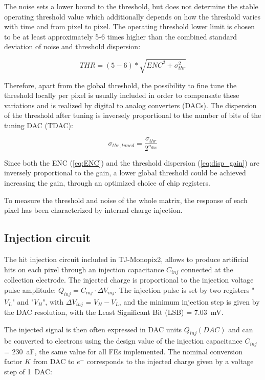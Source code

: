 \medskip
The noise sets a lower bound to the threshold, but does not determine the stable operating threshold value which additionally depends on how the threshold varies with time and from pixel to pixel. The operating threshold lower limit is chosen to be at least approximately 5-6 times higher than the combined standard deviation of noise and threshold dispersion:

\begin{equation}
THR=(5-6) *\sqrt{ENC^{2} + \sigma_{thr}^{2}}
\end{equation}

\medskip
Therefore, apart from the global threshold, the possibility to fine tune the threshold locally per pixel is usually included in order to compensate these variations and is realized by digital to analog converters (DACs). The dispersion of the threshold after tuning is inversely proportional to the number of bits of the tuning DAC (TDAC):

\begin{equation}
\sigma_{thr,tuned} = \frac{\sigma_{thr}}{2^{n_{dac}}}
\end{equation}


\medskip
Since both the ENC (\autoref{eq:ENC}) and the threshold dispersion (\autoref{eq:disp_gain}) are inversely proportional to the gain, a lower global threshold could be achieved increasing the gain, through an optimized choice of chip registers.

To measure the threshold and noise of the whole matrix, the response of each pixel has been characterized by internal charge injection. \\


\subsection{Injection circuit} 
\label{sec:inj_circuit_subsection}

The hit injection circuit included in TJ-Monopix2, allows to produce artificial hits on each pixel through an injection capacitance \textbf{$C_{inj}$} connected at the collection electrode. The injected charge is proportional to the injection voltage pulse amplitude: $Q_{inj} = C_{inj} \cdot \Delta V_{inj}$. The injection pulse is set by two registers "\textbf{$V_{L}$}" and "\textbf{$V_{H}$}", with $\Delta V_{inj}$ = \textbf{$V_{H}-V_{L}$}, and the minimum injection step is given by the DAC resolution, with the Least Significant Bit (LSB) = \SI{7.03}{mV}. 

The injected signal is then often expressed in DAC units $Q_{inj}(DAC)$ and can be converted to electrons using the design value of the injection capacitance \textbf{$C_{inj}$} = \SI{230}{aF}, the same value for all FEs implemented.  
The nominal conversion factor $K$ from DAC to $e^{-}$ corresponds to the injected charge given by a voltage step of \SI{1}{DAC}: 

